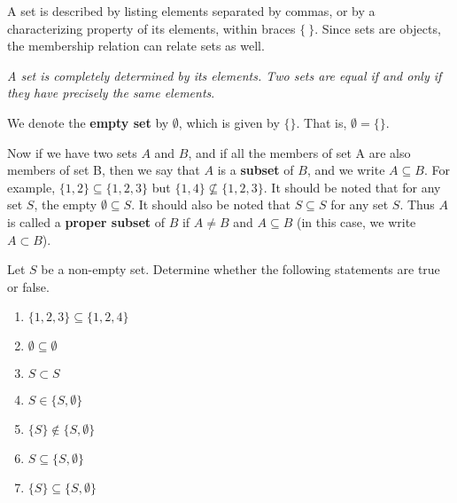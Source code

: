 A set is described by listing elements separated by commas, or by a characterizing property of its elements, within braces $\{ \ \}$. Since sets are objects, the membership relation can relate sets as well.

\textit{A set is completely determined by its elements. Two sets are equal if and only if they have precisely the same elements}.

We denote the \textbf{empty set} by $\emptyset$, which is given by $\{\}$. That is, $\emptyset = \{\}$.

Now if we have two sets $A$ and $B$, and if all the members of set A are also members of set B, then we say that $A$ is a \textbf{subset} of $B$, and we write $A \subseteq B$. For example, $\{1, 2\} \subseteq \{1, 2, 3\}$ but $\{1, 4\} \not\subseteq \{1, 2, 3\}$. It should be noted that for any set $S$, the empty $\emptyset \subseteq S$. It should also be noted that $S \subseteq S$ for any set $S$. Thus $A$ is called a \textbf{proper subset} of $B$ if $A \neq B$ and $A \subseteq B$ (in this case, we write $A \subset B$).

\newpage

\begin{exercise}
    Let $S$ be a non-empty set. Determine whether the following statements are true or false.
    \begin{enumerate}[label=(\alph*)]
        \item $\{1, 2, 3\} \subseteq \{1, 2, 4\}$
        \item $\emptyset \subseteq \emptyset$
        \item $S \subset S$
        \item $S \in \{S, \emptyset\}$
        \item $\{S\} \notin \{S, \emptyset\}$
        \item $S \subseteq \{S, \emptyset\}$
        \item $\{S\} \subseteq \{S, \emptyset\}$
    \end{enumerate}
\end{exercise}

